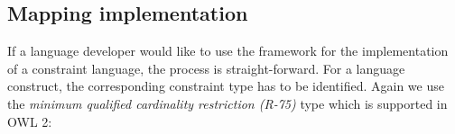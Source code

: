 \documentclass[a4paper,fontsize=11pt]{scrartcl}
\newenvironment{DL}{
  \vspace{0cm}
	\begin{center}
  \begin{tabular}{r l}

}{
  \end{tabular}
	\end{center}
}
\begin{document}

%
%
%



\subsection{Mapping implementation}

If a language developer would like to use the framework for the implementation of a constraint language, the process is straight-forward. For a language construct, the corresponding constraint type has to be identified. Again we use the \emph{minimum qualified cardinality restriction (R-75)} type which is supported in OWL 2:
\end{document}
